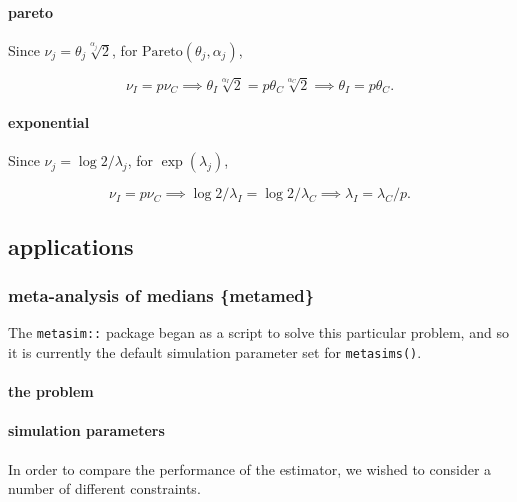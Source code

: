 \documentclass[]{article}
\let\oldparagraph\paragraph
\renewcommand{\paragraph}[1]{\oldparagraph{#1}\mbox{}}
\begin{document}
\hypertarget{pareto-1}{%
\paragraph{pareto}\label{pareto-1}}

Since \(\nu_j = \theta_j \sqrt[\alpha_j]2\), for
\(\mathrm{Pareto}(\theta_j, \alpha_j)\),

\[
\nu_I = p \nu_C \implies \theta_I \sqrt[\alpha_I]2 = p \theta_C \sqrt[\alpha_C]2 \implies \theta_I = p\theta_C.
\]

\hypertarget{exponential-1}{%
\paragraph{exponential}\label{exponential-1}}

Since \(\nu_j = \log2/\lambda_j\), for \(\exp(\lambda_j)\),

\[
\nu_I = p \nu_C \implies \log2/\lambda_I = \log2/\lambda_C \implies \lambda_I = \lambda_C/p. 
\]

\hypertarget{applications}{%
\subsection{applications}\label{applications}}

\hypertarget{meta-analysis-of-medians-metamed}{%
\subsubsection{meta-analysis of medians
\{metamed\}}\label{meta-analysis-of-medians-metamed}}

The \texttt{metasim::} package began as a script to solve this
particular problem, and so it is currently the default simulation
parameter set for \texttt{metasims()}.

\hypertarget{the-problem}{%
\paragraph{the problem}\label{the-problem}}

\hypertarget{simulation-parameters-1}{%
\paragraph{simulation parameters}\label{simulation-parameters-1}}

In order to compare the performance of the estimator, we wished to
consider a number of different constraints.
\end{document}
